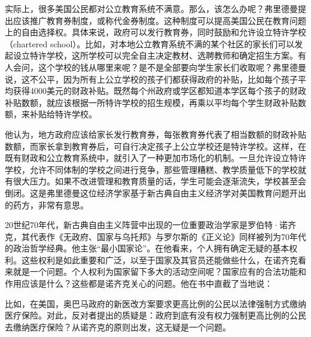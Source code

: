 实际上，很多美国公民都对公立教育系统不满意。那么，该怎么办呢？弗里德曼提出应该推广教育券制度，或称代金券制度。这种制度可以提高美国公民在教育问题上的自由选择权。具体来说，政府可以发行教育券，同时鼓励和允许设立特许学校（chartered school）。比如，对本地公立教育系统不满的某个社区的家长们可以发起设立特许学校，这所学校可以完全自主决定教材、选聘教师和确定招生方案。有人会问，这个学校的钱从哪里来呢？是不是全部要向学生家长们收取呢？弗里德曼说，这不公平，因为所有上公立学校的孩子们都获得政府的补贴，比如每个孩子平均获得4000美元的财政补贴。既然每个州政府或学区都知道本学区每个孩子的财政补贴数额，就应该根据一所特许学校的招生规模，再乘以平均每个学生财政补贴数额，来补贴给特许学校。

他认为，地方政府应该给家长发行教育券，每张教育券代表了相当数额的财政补贴数额，而家长拿到教育券后，可自行决定孩子上公立学校还是特许学校。这样，在既有财政和公立教育系统中，就引入了一种更加市场化的机制。一旦允许设立特许学校，允许不同体制的学校之间进行竞争，那些管理糟糕、教学质量低下的学校就有很大压力。如果不改进管理和教育质量的话，学生可能会逐渐流失，学校甚至会倒闭。这是弗里德曼这位经济学家基于新古典自由主义经济学对美国教育问题开出的药方，非常有意思。

20世纪70年代，新古典自由主义阵营中出现的一位重要政治学家是罗伯特·诺齐克，其代表作《无政府、国家与乌托邦》与罗尔斯的《正义论》同样被列为70年代的政治哲学经典。他主张“最小国家论”。在他看来，个人拥有确定无疑的基本权利。这些权利是如此重要和广泛，以至于国家及其官员还能做些什么，在诺齐克看来就是一个问题。个人权利为国家留下多大的活动空间呢？国家应有的合法功能和作用应该是什么？这些都是诺齐克关心的问题。他在书中直截了当地说：


比如，在美国，奥巴马政府的新医改方案要求更高比例的公民以法律强制方式缴纳医疗保险。对此，反对者提出的质疑是：政府到底有没有权力强制更高比例的公民去缴纳医疗保险？从诺齐克的原则出发，这无疑是一个问题。

